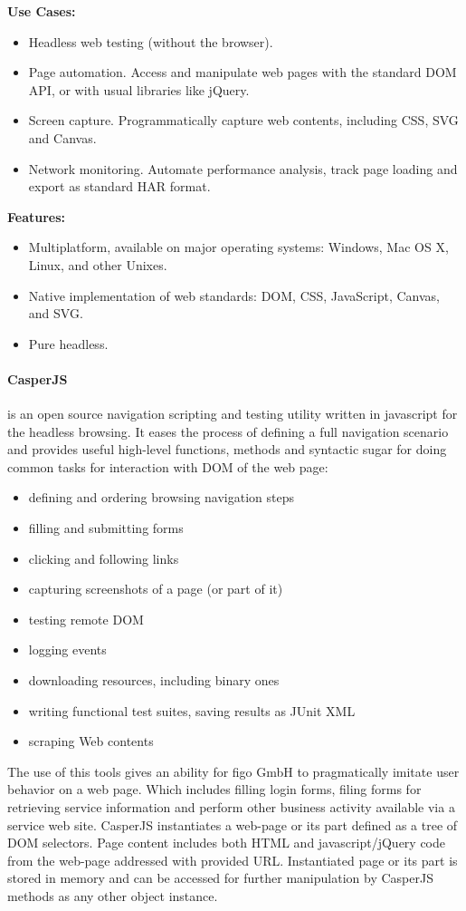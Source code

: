 \textbf{Use Cases:}
\begin{itemize}
	\item Headless web testing (without the browser).
	\item Page automation. Access and manipulate web pages with the standard DOM API, or with usual libraries like jQuery.
	\item Screen capture. Programmatically capture web contents, including CSS, SVG and Canvas.
	\item Network monitoring. Automate performance analysis, track page loading and export as standard HAR format.
\end{itemize}

\textbf{Features:}
\begin{itemize}
	\item Multiplatform, available on major operating systems: Windows, Mac OS X, Linux, and other Unixes.
	\item Native implementation of web standards: DOM, CSS, JavaScript, Canvas, and SVG.
	\item Pure headless.
\end{itemize}

\paragraph{CasperJS} is an open source navigation scripting and testing utility written in javascript for the headless browsing. It eases the process of defining a full navigation scenario and provides useful high-level functions, methods and syntactic sugar for doing common tasks for interaction with DOM of the web page\cite{casperjs}:
\begin{itemize}
	\item defining and ordering browsing navigation steps
	\item filling and submitting forms
	\item clicking and following links
	\item capturing screenshots of a page (or part of it)
	\item testing remote DOM
	\item logging events
	\item downloading resources, including binary ones
	\item writing functional test suites, saving results as JUnit XML
	\item scraping Web contents
\end{itemize}

The use of this tools gives an ability for figo GmbH to pragmatically imitate user behavior on a web page. Which includes filling login forms, filing forms for retrieving service information and perform other business activity available via a service web site. CasperJS instantiates a web-page or its part defined as a tree of DOM selectors.  Page content includes both HTML and javascript/jQuery code from the web-page addressed with provided URL. Instantiated page or its part is stored in memory and can be accessed for further manipulation by CasperJS methods as any other object instance.